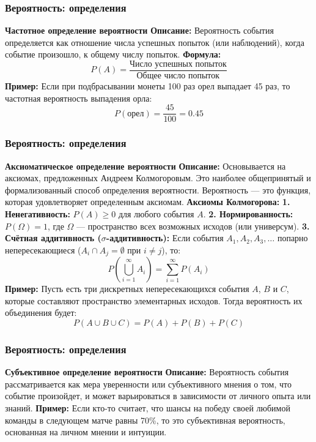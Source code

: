 \documentclass[aspectratio=169]{beamer}
\begin{document}
\begin{frame}
\frametitle{Вероятность: определения}
\textbf{Частотное определение вероятности}
\newline
\textbf{Описание:} Вероятность события определяется как отношение числа успешных попыток (или наблюдений), когда событие произошло, к общему числу попыток.
\newline
\textbf{Формула:}
  \[
  P(A) = \frac{\text{Число успешных попыток}}{\text{Общее число попыток}}
  \]
\newline
\textbf{Пример:} Если при подбрасывании монеты 100 раз орел выпадает 45 раз, то частотная вероятность выпадения орла:
  \[
  P(\text{орел}) = \frac{45}{100} = 0.45
  \]
\end{frame}

\begin{frame}
\frametitle{Вероятность: определения}
\textbf{Аксиоматическое определение вероятности}
\newline
\textbf{Описание:} Основывается на аксиомах, предложенных Андреем Колмогоровым. Это наиболее общепринятый и формализованный способ определения вероятности. Вероятность — это функция, которая удовлетворяет определенным аксиомам.
\newline
\textbf{Аксиомы Колмогорова:}
\newline
\textbf{1. Ненегативность:} \( P(A) \geq 0 \) для любого события \( A \).
\newline
\textbf{2. Нормированность:} \( P(\Omega) = 1 \), где \( \Omega \) — пространство всех возможных исходов (или универсум).
\newline
\textbf{3. Счётная аддитивность ($\sigma$-аддитивность):} Если события \( A_1, A_2, A_3, \dots \) попарно непересекающиеся (\( A_i \cap A_j = \emptyset \) при \( i \neq j \)), то:  
   \[
   P\left(\bigcup_{i=1}^{\infty} A_i\right) = \sum_{i=1}^{\infty} P(A_i)
   \]
\textbf{Пример:} Пусть есть три дискретных непересекающихся события \( A \), \( B \) и \( C \), которые составляют пространство элементарных исходов. Тогда вероятность их объединения будет:
  \[
  P(A \cup B \cup C) = P(A) + P(B) + P(C)
  \]
\end{frame}

\begin{frame}
\frametitle{Вероятность: определения}
\textbf{Субъективное определение вероятности}
\newline
\textbf{Описание:} Вероятность события рассматривается как мера уверенности или субъективного мнения о том, что событие произойдет, и может варьироваться в зависимости от личного опыта или знаний.
\newline
\textbf{Пример:} Если кто-то считает, что шансы на победу своей любимой команды в следующем матче равны 70\%, то это субъективная вероятность, основанная на личном мнении и интуиции.
\end{frame}
\end{document}
